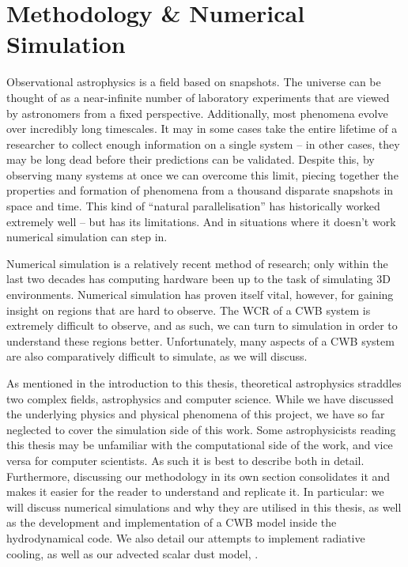 \chapter{Methodology \& Numerical Simulation}
\label{ch:numsim}

Observational astrophysics is a field based on snapshots.
The universe can be thought of as a near-infinite number of laboratory experiments that are viewed by astronomers from a fixed perspective.
Additionally, most phenomena evolve over incredibly long timescales.
It may in some cases take the entire lifetime of a researcher to collect enough information on a single system -- in other cases, they may be long dead before their predictions can be validated.
Despite this, by observing many systems at once we can overcome this limit, piecing together the properties and formation of phenomena from a thousand disparate snapshots in space and time.
This kind of ``natural parallelisation'' has historically worked extremely well -- but has its limitations.
And in situations where it doesn't work numerical simulation can step in.

Numerical simulation is a relatively recent method of research; only within the last two decades has computing hardware been up to the task of simulating 3D environments.
Numerical simulation has proven itself vital, however, for gaining insight on regions that are hard to observe.
The WCR of a CWB system is extremely difficult to observe, and as such, we can turn to simulation in order to understand these regions better.
Unfortunately, many aspects of a CWB system are also comparatively difficult to simulate, as we will discuss.

As mentioned in the introduction to this thesis, theoretical astrophysics straddles two complex fields, astrophysics and computer science.
While we have discussed the underlying physics and physical phenomena of this project, we have so far neglected to cover the simulation side of this work.
Some astrophysicists reading this thesis may be unfamiliar with the computational side of the work, and vice versa for computer scientists.
As such it is best to describe both in detail.
Furthermore, discussing our methodology in its own section consolidates it and makes it easier for the reader to understand and replicate it.
In particular: we will discuss numerical simulations and why they are utilised in this thesis, as well as the development and implementation of a CWB model inside the \athena{} hydrodynamical code.
We also detail our attempts to implement radiative cooling, as well as our advected scalar dust model, \bidmas.

